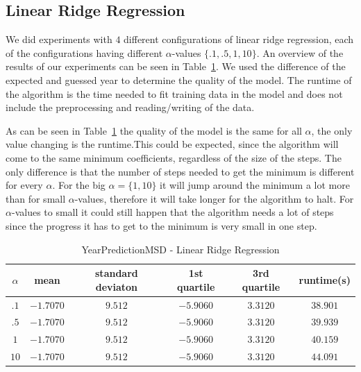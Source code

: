 \subsection{Linear Ridge Regression}\label{ds2:lrr}
We did experiments with $4$ different configurations of linear ridge regression, each of the configurations having different $\alpha$-values $\{.1,.5,1,10\}$. An overview of the results of our experiments can be seen in Table~\ref{ypmsd:table:lrrresults}. We used the difference of the expected and guessed year to determine the quality of the model. The runtime of the algorithm is the time needed to fit training data in the model and does not include the preprocessing and reading/writing of the data.\par
As can be seen in Table~\ref{ypmsd:table:lrrresults} the quality of the model is the same for all $\alpha$, the only value changing is the runtime.This could be expected, since the algorithm will come to the same minimum coefficients, regardless of the size of the steps. The only difference is that the number of steps needed to get the minimum is different for every $\alpha$. For the big $\alpha=\{1,10\}$ it will jump around the minimum a lot more than for small $\alpha$-values, therefore it will take longer for the algorithm to halt. For $\alpha$-values to small it could still happen that the algorithm needs a lot of steps since the progress it has to get to the minimum is very small in one step.
\begin{table}[p]
	\begin{center}
		\begin{tabular}{|c|c|c|c|c|c|}
			\hline	$\alpha$&mean&standard deviaton&1st quartile&3rd quartile&runtime(s)\\
\hline$.1$&$-1.7070$&$9.512$&$-5.9060$&$3.3120$&$38.901$\\
\hline$.5$&$-1.7070$&$9.512$&$-5.9060$&$3.3120$&$39.939$\\
\hline$1$&$-1.7070$&$9.512$&$-5.9060$&$3.3120$&$40.159$\\
\hline$10$&$-1.7070$&$9.512$&$-5.9060$&$3.3120$&$44.091$\\\hline
\end{tabular}
\end{center}
\caption{YearPredictionMSD - Linear Ridge Regression\label{ypmsd:table:lrrresults}}
\end{table}
